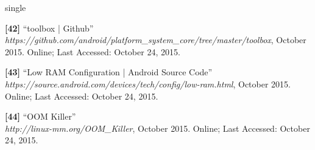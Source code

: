 \documentclass[12pt]{uthesis-v12}  %
\begin{document}
\begin{referencelist}{single}
	\item \textbf{[42]} ``toolbox | Github''
	\\\emph{https://github.com/android/platform\_system\_core/tree/master/toolbox}, October 2015. 
	Online; Last Accessed: October 24, 2015.	
					
	\item \textbf{[43]} ``Low RAM Configuration | Android Source Code''
	\\\emph{https://source.android.com/devices/tech/config/low-ram.html}, October 2015. 
	Online; Last Accessed: October 24, 2015.
						
	\item \textbf{[44]} ``OOM Killer''
	\\\emph{http://linux-mm.org/OOM\_Killer}, October 2015. 
	Online; Last Accessed: October 24, 2015.
							
\end{referencelist}



\end{document}
